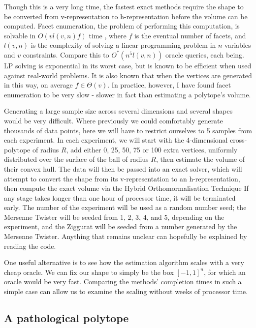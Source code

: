 Though this is a very long time, the fastest exact methods require the shape to be converted from v-representation to h-representation before the volume can be computed. Facet enumeration, the problem of performing this computation, is solvable in $O(vl(v,n)f)$ time %
, where $f$ is the eventual number of facets, and $l(v,n)$ is the complexity of solving a linear programming problem in $n$ variables and $v$ constraints. Compare this to $O^{*}(n^5l(v,n))$ oracle queries, each being. LP solving is exponential in its worst case,%
 but is known to be efficient when used against real-world problems. It is also known that when the vertices are generated in this way, on average $f \in \Theta(v)$. In practice, however, I have found facet enumeration to be very slow - slower in fact than estimating a polytope's volume.

Generating a large sample size across several dimensions and several shapes would be very difficult. Where previously we could comfortably generate thousands of data points, here we will have to restrict ourselves to 5 samples from each experiment. In each experiment, we will start with the 4-dimensional cross-polytope of radius $R$, add either 0, 25, 50, 75 or 100 extra vertices, uniformly distributed over the surface of the ball of radius $R$, then estimate the volume of their convex hull. The data will then be passed into an exact solver, which will attempt to convert the shape from its v-representation to an h-representation, then compute the exact volume via the Hybrid Orthomormalisation Technique %
If any stage takes longer than one hour of processor time, it will be terminated early. The number of the experiment will be used as a random number seed; the Mersenne Twister will be seeded from 1, 2, 3, 4, and 5, depending on the experiment, and the Ziggurat will be seeded from a number generated by the Mersenne Twister. Anything that remains unclear can hopefully be explained by reading the code. %



One useful alternative is to see how the estimation algorithm scales with a very cheap oracle. We can fix our shape to simply be the box $[-1,1]^n$, for which an oracle would be very fast. Comparing the methods' completion times in such a simple case can allow us to examine the scaling without weeks of processor time.


\subsection{A pathological polytope}

